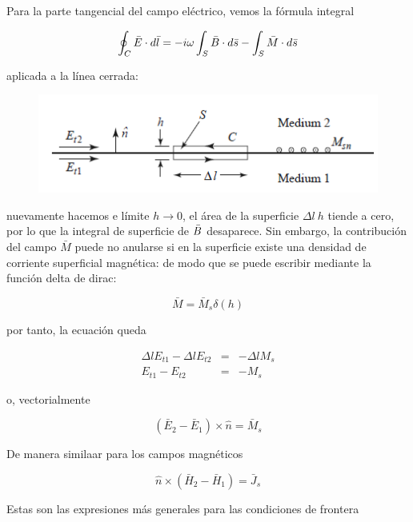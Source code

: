 Para la parte tangencial del campo eléctrico, vemos la fórmula integral 

\begin{equation*}
\oint_C \bar{E} \cdot d \Bar{l} = - i \omega \int_S \bar{B} \cdot d \bar{s} - \int_S \bar{M} \cdot d \bar{s}
\end{equation*}

aplicada a la línea cerrada:

\begin{figure}[H]
    \centering
    \includegraphics[scale=0.6]{Waves/waves_f8.png}
\end{figure}

nuevamente hacemos e límite $h \to 0$, el área de la superficie $\Delta l \ h$ tiende a cero, por lo que la integral de superficie de $\Bar{B}$ desaparece. Sin embargo, la contribución del campo $\bar{M}$ puede no anularse si en la superficie existe una densidad de corriente superficial magnética: de modo que se puede escribir mediante la función delta de dirac:

\begin{equation*}
\bar{M} = \bar{M}_s \delta (h)
\end{equation*}

por tanto, la ecuación queda

\begin{eqnarray*}
\Delta l E_{t1} - \Delta l E_{t2} &=& - \Delta l M_s \\
 E_{t1} - E_{t2} &=& - M_s
\end{eqnarray*}

o, vectorialmente

\begin{equation*}
\left( \bar{E}_2 - \bar{E}_1 \right) \times \hat{n} = \bar{M}_s
\end{equation*}

De manera similaar para los campos magnéticos

\begin{equation*}
\hat{n} \times \left( \bar{H}_2 - \bar{H}_1 \right) = \bar{J}_s
\end{equation*}

Estas son las expresiones más generales para las condiciones de frontera

